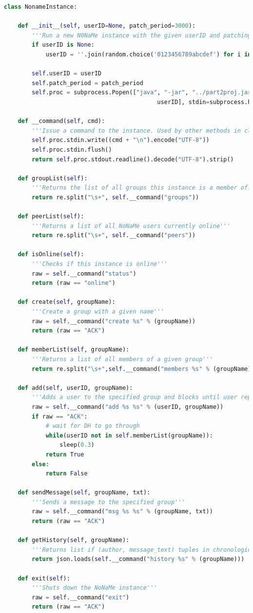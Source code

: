 \documentclass[a4paper, twoside, 12pt]{report}
\begin{document}
\begin{lstlisting}[language = Python, columns=fullflexible, basicstyle=\scriptsize\ttfamily]
class NonameInstance:

    def __init__(self, userID=None, patch_period=3000):
        '''Run a new N0NaMe instance with the given userID and patching period'''
        if userID is None:
            userID = ''.join(random.choice('0123456789abcdef') for i in range(10))

        self.userID = userID
        self.patch_period = patch_period
        self.proc = subprocess.Popen(["java", "-jar", "../part2proj.jar", "-m", str(patch_period), 
                                            userID], stdin=subprocess.PIPE, stdout=subprocess.PIPE)

    def __command(self, cmd):
        '''Issue a command to the instance. Used by other methods in class.'''
        self.proc.stdin.write((cmd + "\n").encode("UTF-8"))
        self.proc.stdin.flush()
        return self.proc.stdout.readline().decode("UTF-8").strip()

    def groupList(self):
        '''Returns the list of all groups this instance is a member of.'''
        return re.split("\s+", self.__command("groups"))

    def peerList(self):
        '''Returns a list of all NoNaMe users currently online'''
        return re.split("\s+", self.__command("peers"))

    def isOnline(self):
        '''Checks if this instance is online'''
        raw = self.__command("status")
        return (raw == "online")

    def create(self, groupName):
        '''Create a group with a given name'''
        raw = self.__command("create %s" % (groupName))
        return (raw == "ACK")

    def memberList(self, groupName):
        '''Returns a list of all members of a given group'''
        return re.split("\s+",self.__command("members %s" % (groupName)))

    def add(self, userID, groupName):
        '''Adds a user to the specified group and blocks until user replies'''
        raw = self.__command("add %s %s" % (userID, groupName))
        if raw == "ACK":
            # wait for DH to go through
            while(userID not in self.memberList(groupName)):
                sleep(0.3)
            return True
        else:
            return False

    def sendMessage(self, groupName, txt):
        '''Sends a message to the specified group'''
        raw = self.__command("msg %s %s" % (groupName, txt))
        return (raw == "ACK")
        
    def getHistory(self, groupName):
        '''Returns list if (author, message_text) tuples in chronological order'''
        return json.loads(self.__command("history %s" % (groupName)))

    def exit(self):
        '''Shuts down the NoNaMe instance'''
        raw = self.__command("exit")
        return (raw == "ACK")
\end{lstlisting}
\end{document}
